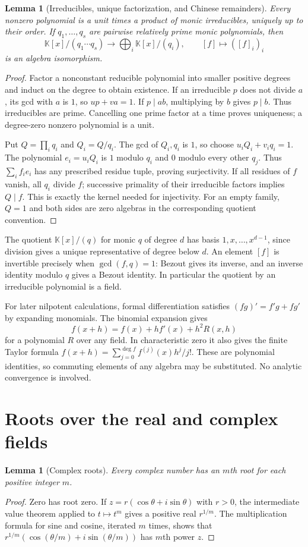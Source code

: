 \documentclass[11pt,a4paper]{book}
\newtheorem{lemma}[theorem]{Lemma}
\theoremstyle{definition}\newtheorem{definition}[theorem]{Definition}
\theoremstyle{remark}\newtheorem{remark}[theorem]{Remark}
\newcommand{\K}{\mathbb K}\newcommand{\R}{\mathbb R}\newcommand{\C}{\mathbb C}
\begin{document}
\begin{lemma}[Irreducibles, unique factorization, and Chinese remainders]\label{aux:polynomial-crt}
Every nonzero polynomial is a unit times a product of monic irreducibles, uniquely up to their order. If $q_1,\ldots,q_s$ are pairwise relatively prime monic polynomials, then
\[
 \K[x]/(q_1\cdots q_s)\longrightarrow\bigoplus_i\K[x]/(q_i),\qquad [f]\longmapsto([f]_i)_i
\]
is an algebra isomorphism.
\end{lemma}
\begin{proof}
Factor a nonconstant reducible polynomial into smaller positive degrees and induct on the degree to obtain existence. If an irreducible $p$ does not divide $a$, its gcd with $a$ is $1$, so $up+va=1$. If $p\mid ab$, multiplying by $b$ gives $p\mid b$. Thus irreducibles are prime. Cancelling one prime factor at a time proves uniqueness; a degree-zero nonzero polynomial is a unit.

Put $Q=\prod_iq_i$ and $Q_i=Q/q_i$. The gcd of $Q_i,q_i$ is $1$, so choose $u_iQ_i+v_iq_i=1$. The polynomial $e_i=u_iQ_i$ is $1$ modulo $q_i$ and $0$ modulo every other $q_j$. Thus $\sum_i f_i e_i$ has any prescribed residue tuple, proving surjectivity. If all residues of $f$ vanish, all $q_i$ divide $f$; successive primality of their irreducible factors implies $Q\mid f$. This is exactly the kernel needed for injectivity. For an empty family, $Q=1$ and both sides are zero algebras in the corresponding quotient convention.
\end{proof}

The quotient $\K[x]/(q)$ for monic $q$ of degree $d$ has basis $1,x,\ldots,x^{d-1}$, since division gives a unique representative of degree below $d$. An element $[f]$ is invertible precisely when $\gcd(f,q)=1$: Bezout gives its inverse, and an inverse identity modulo $q$ gives a Bezout identity. In particular the quotient by an irreducible polynomial is a field.

For later nilpotent calculations, formal differentiation satisfies $(fg)'=f'g+fg'$ by expanding monomials. The binomial expansion gives
\[
 f(x+h)=f(x)+hf'(x)+h^2R(x,h)
\]
for a polynomial $R$ over any field. In characteristic zero it also gives the finite Taylor formula $f(x+h)=\sum_{j=0}^{\deg f} f^{(j)}(x)h^j/j!$. These are polynomial identities, so commuting elements of any algebra may be substituted. No analytic convergence is involved.

\section{Roots over the real and complex fields}
\begin{lemma}[Complex roots]\label{aux:complex-roots}
Every complex number has an $m$th root for each positive integer $m$.
\end{lemma}
\begin{proof}
Zero has root zero. If $z=r(\cos\theta+i\sin\theta)$ with $r>0$, the intermediate value theorem applied to $t\mapsto t^m$ gives a positive real $r^{1/m}$. The multiplication formula for sine and cosine, iterated $m$ times, shows that $r^{1/m}(\cos(\theta/m)+i\sin(\theta/m))$ has $m$th power $z$.
\end{proof}
\end{document}
